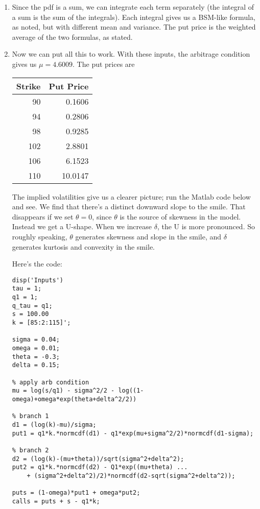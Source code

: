 \documentclass[11pt]{article}
\begin{document}
\begin{enumerate}
\begin{enumerate}
\item Since the pdf is a sum, we can integrate
each term separately (the integral of a sum is the sum of the integrals).
Each integral gives us a BSM-like formula, as noted,
but with different mean and variance.
The put price is the weighted average of the two formulas, as stated.

\item Now we can put all this to work.
With these inputs, the arbitrage condition gives us $ \mu = 4.6009$.
The put prices are

\begin{center}
\tabcolsep=0.15in
\begin{tabular}{rr}
\toprule
Strike    &  Put Price  \\
\midrule
  90   & 0.1606   \\
   94  &  0.2806  \\
   98  &  0.9285  \\
  102  &  2.8801  \\
  106  &  6.1523  \\
  110  & 10.0147 \\
\bottomrule
\end{tabular}
\end{center}

The implied volatilities give us a clearer picture;
run the Matlab code below and see.
We find that there's a distinct downward slope to the smile.
That disappears if we set $\theta = 0$, since $\theta$ is the source
of skewness in the model.
Instead we get a U-shape.
When we increase $\delta$, the U is more pronounced.
So roughly speaking, $\theta$ generates skewness and slope
in the smile,
and $\delta$ generates kurtosis and convexity in the smile.

Here's the code:
\begin{verbatim}
disp('Inputs')
tau = 1;
q1 = 1;
q_tau = q1;
s = 100.00
k = [85:2:115]';

sigma = 0.04;
omega = 0.01;
theta = -0.3;
delta = 0.15;

% apply arb condition
mu = log(s/q1) - sigma^2/2 - log((1-omega)+omega*exp(theta+delta^2/2))

% branch 1
d1 = (log(k)-mu)/sigma;
put1 = q1*k.*normcdf(d1) - q1*exp(mu+sigma^2/2)*normcdf(d1-sigma);

% branch 2
d2 = (log(k)-(mu+theta))/sqrt(sigma^2+delta^2);
put2 = q1*k.*normcdf(d2) - Q1*exp((mu+theta) ...
    + (sigma^2+delta^2)/2)*normcdf(d2-sqrt(sigma^2+delta^2));

puts = (1-omega)*put1 + omega*put2;
calls = puts + s - q1*k;


\end{verbatim}
\end{enumerate}
\end{enumerate}
\end{document}
